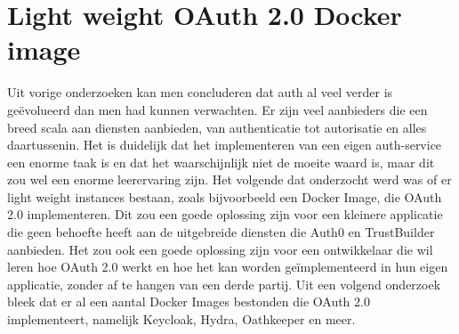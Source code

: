 \section{Light weight OAuth 2.0 Docker image}%
\label{sec:light-weight-oauth-2.0-docker-image}
Uit vorige onderzoeken kan men concluderen dat auth al veel verder is geëvolueerd dan men had kunnen verwachten. Er zijn veel aanbieders die een breed scala aan diensten aanbieden, van authenticatie tot autorisatie en alles daartussenin. Het is duidelijk dat het implementeren van een eigen auth-service een enorme taak is en dat het waarschijnlijk niet de moeite waard is, maar dit zou wel een enorme leerervaring zijn.
\newline
\newline
Het volgende dat onderzocht werd was of er light weight instances bestaan, zoals bijvoorbeeld een Docker Image, die OAuth 2.0 implementeren. Dit zou een goede oplossing zijn voor een kleinere applicatie die geen behoefte heeft aan de uitgebreide diensten die Auth0 en TrustBuilder aanbieden. Het zou ook een goede oplossing zijn voor een ontwikkelaar die wil leren hoe OAuth 2.0 werkt en hoe het kan worden geïmplementeerd in hun eigen applicatie, zonder af te hangen van een derde partij.
\newline
\newline
Uit een volgend onderzoek bleek dat er al een aantal Docker Images bestonden die OAuth 2.0 implementeert, namelijk Keycloak, Hydra, Oathkeeper en meer.
